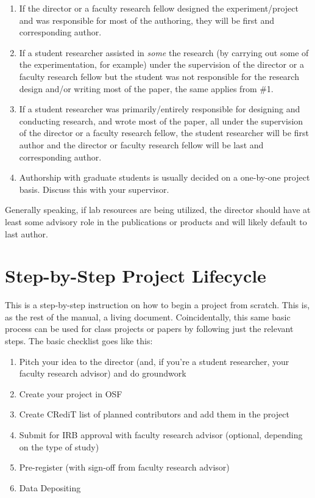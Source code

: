 \documentclass[
]{book}
\providecommand{\tightlist}{%
  \setlength{\itemsep}{0pt}\setlength{\parskip}{0pt}}
\begin{document}
\begin{enumerate}
\def\labelenumi{\arabic{enumi}.}
\tightlist
\item
  If the director or a faculty research fellow designed the experiment/project and was responsible for most of the authoring, they will be first and corresponding author.
\item
  If a student researcher assisted in \emph{some} the research (by carrying out some of the experimentation, for example) under the supervision of the director or a faculty research fellow but the student was not responsible for the research design and/or writing most of the paper, the same applies from \#1.
\item
  If a student researcher was primarily/entirely responsible for designing and conducting research, and wrote most of the paper, all under the supervision of the director or a faculty research fellow, the student researcher will be first author and the director or faculty research fellow will be last and corresponding author.
\item
  Authorship with graduate students is usually decided on a one-by-one project basis. Discuss this with your supervisor.
\end{enumerate}

Generally speaking, if lab resources are being utilized, the director should have at least some advisory role in the publications or products and will likely default to last author.

\hypertarget{appendix-appendix}{%
\appendix}


\hypertarget{step-by-step-project-lifecycle}{%
\chapter{Step-by-Step Project Lifecycle}\label{step-by-step-project-lifecycle}}

This is a step-by-step instruction on how to begin a project from scratch. This is, as the rest of the manual, a living document. Coincidentally, this same basic process can be used for class projects or papers by following just the relevant steps. The basic checklist goes like this:

\begin{enumerate}
\def\labelenumi{\arabic{enumi}.}
\tightlist
\item
  Pitch your idea to the director (and, if you're a student researcher, your faculty research advisor) and do groundwork
\item
  Create your project in OSF
\item
  Create CRediT list of planned contributors and add them in the project
\item
  Submit for IRB approval with faculty research advisor (optional, depending on the type of study)
\item
  Pre-register (with sign-off from faculty research advisor)
\item
  Data Depositing
\end{enumerate}
\end{document}
